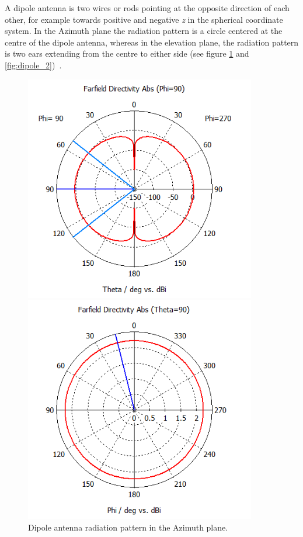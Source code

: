 A dipole antenna is two wires or rods pointing at the opposite direction of each other, for example towards positive and negative \textit{z} in the spherical coordinate system. In the Azimuth plane the radiation pattern is a circle centered at the centre of the dipole antenna, whereas in the elevation plane, the radiation pattern is two ears extending from the centre to either side (see figure \ref{fig:dipole_1} and \ref{fig:dipole_2})~\cite[pp. 12-14]{ant_beam_form}.
\begin{figure}[H]
    \begin{minipage}{0.45\textwidth}
        \centering
        \includegraphics[width=0.9\textwidth]{figures/farfield (f=2.4) dipole.png} %
        \caption{Dipole antenna radiation pattern in the Azimuth plane.} 
        \label{fig:dipole_1}
    \end{minipage}\hfill
    \begin{minipage}{0.45\textwidth}
        \centering
        \includegraphics[width=0.9\textwidth]{figures/farfield (f=2.4) dipole_1.png} %

\end{minipage}
\end{figure}
